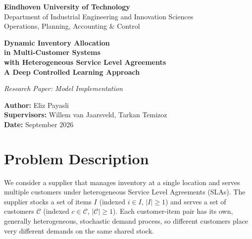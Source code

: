 \documentclass[11pt, a4paper]{article}
\theoremstyle{definition}
\theoremstyle{remark}
\begin{document}
\begin{titlepage}
    \centering
    \vspace*{1.5cm}

    {\Large \textbf{Eindhoven University of Technology}\\[0.3em]
    Department of Industrial Engineering and Innovation Sciences\\
    Operations, Planning, Accounting \& Control}

    \vspace{3cm}

    {\LARGE \textbf{Dynamic Inventory Allocation\\[0.5em]
    in Multi-Customer Systems\\[0.5em]
    with Heterogeneous Service Level Agreements\\[0.5em]
    A Deep Controlled Learning Approach}}

    \vspace{2.5cm}

    {\large \textit{Research Paper: Model Implementation}}

    \vspace{2cm}

    {\large
    \textbf{Author:} Eliz Payasli \\[0.7em]
    \textbf{Supervisors:} Willem van Jaarsveld, Tarkan Temizoz \\[0.3em]
    \textbf{Date:} September 2026 \\[0.3em]

    }

\end{titlepage}

\raggedright

\newpage
\section{Problem Description}

We consider a supplier that manages inventory at a single location and serves multiple customers under heterogeneous Service Level Agreements (SLAs). The supplier stocks a set of items $I$ (indexed $i \in I$, $|I| \geq 1$) and serves a set of customers $\mathcal{C}$ (indexed $c \in \mathcal{C}$, $|\mathcal{C}| \geq 1$). Each customer-item pair has its own, generally heterogeneous, stochastic demand process, so different customers place very different demands on the same shared stock.
\end{document}
